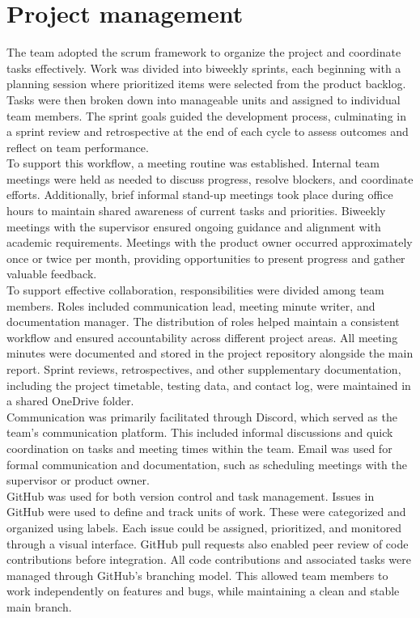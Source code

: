 \newpage

\section{Project management}
\label{sec:methods-project-management}
The team adopted the \gls{scrum} framework to organize the project and coordinate tasks effectively. Work was divided into biweekly sprints, each beginning with a planning session where prioritized items were selected from the product backlog. Tasks were then broken down into manageable units and assigned to individual team members. The sprint goals guided the development process, culminating in a sprint review and retrospective at the end of each cycle to assess outcomes and reflect on team performance. \\

To support this workflow, a meeting routine was established. Internal team meetings were held as needed to discuss progress, resolve blockers, and coordinate efforts. Additionally, brief informal stand-up meetings took place during office hours to maintain shared awareness of current tasks and priorities. Biweekly meetings with the supervisor ensured ongoing guidance and alignment with academic requirements. Meetings with the product owner occurred approximately once or twice per month, providing opportunities to present progress and gather valuable feedback. \\

To support effective collaboration, responsibilities were divided among team members. Roles included communication lead, meeting minute writer, and documentation manager. The distribution of roles helped maintain a consistent workflow and ensured accountability across different project areas. All meeting minutes were documented and stored in the project repository alongside the main report. Sprint reviews, retrospectives, and other supplementary documentation, including the project timetable, testing data, and contact log, were maintained in a shared OneDrive folder. \\

Communication was primarily facilitated through Discord, which served as the team's communication platform. This included informal discussions and quick coordination on tasks and meeting times within the team. Email was used for formal communication and documentation, such as scheduling meetings with the supervisor or product owner. \\

GitHub was used for both version control and task management. Issues in GitHub were used to define and track units of work. These were categorized and organized using labels. Each issue could be assigned, prioritized, and monitored through a visual interface. GitHub pull requests also enabled peer review of code contributions before integration. All code contributions and associated tasks were managed through GitHub's branching model. This allowed team members to work independently on features and bugs, while maintaining a clean and stable main branch. \\

